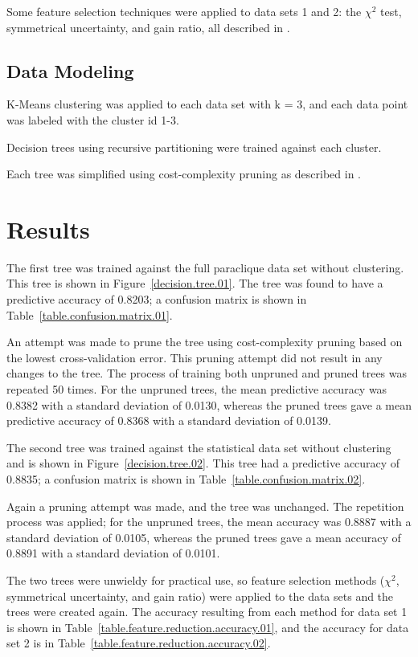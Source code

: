 \documentclass[conference,compsoc]{IEEEtran}
\begin{document}
Some feature selection techniques were applied to data sets 1 and 2: the ${\chi}^2$ test, symmetrical uncertainty, and gain ratio, 
all described in \cite{fselector}.

\subsection{Data Modeling}

K-Means clustering \cite{hartigan} was applied to each data set with k = 3, and each data point was labeled with the cluster id 1-3.

Decision trees using recursive partitioning \cite{rpart} were trained against each cluster.

Each tree was simplified using cost-complexity pruning as described in \cite{quinlan}.

\section{Results}

The first tree was trained against the full paraclique data set without clustering. This tree is shown in Figure~\ref{decision.tree.01}.
The tree was found to have a predictive accuracy of 0.8203; a confusion matrix is shown in Table~\ref{table.confusion.matrix.01}.

An attempt was made to prune the tree using cost-complexity pruning based on the lowest cross-validation error. This pruning attempt did not result in
any changes to the tree. The process of training both unpruned and pruned trees was repeated 50 times. For the unpruned trees, 
the mean predictive accuracy was 0.8382 with a standard deviation of 0.0130, whereas
the pruned trees gave a mean predictive accuracy of 0.8368 with a standard deviation of 0.0139.

The second tree was trained against the statistical data set without clustering and is shown in Figure~\ref{decision.tree.02}. This tree
had a predictive accuracy of 0.8835; a confusion matrix is shown in Table~\ref{table.confusion.matrix.02}.

Again a pruning attempt was made, and the tree was unchanged. The repetition process was applied; for the unpruned trees, the mean accuracy was 0.8887 
with a standard deviation of 0.0105,
whereas the pruned trees gave a mean accuracy of 0.8891 with a standard deviation of 0.0101.

The two trees were unwieldy for practical use, so feature selection methods (${\chi}^2$, symmetrical uncertainty, and gain ratio) were applied to the data sets
and the trees were created again. The accuracy resulting from each method for data set 1 is shown in Table~\ref{table.feature.reduction.accuracy.01},
and the accuracy for data set 2 is in Table~\ref{table.feature.reduction.accuracy.02}.
\end{document}
